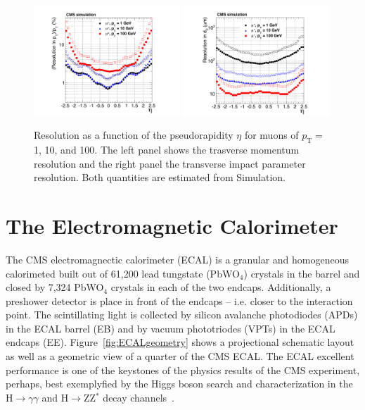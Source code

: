 \begin{figure}
 \centering
\includegraphics[width=0.49\textwidth]{CMS_DetectorFigures/TrackerPtResolution.pdf}
\includegraphics[width=0.49\textwidth]{CMS_DetectorFigures/TrackerImpactParameterResolution.pdf}
 \caption{Resolution as a function of the pseudorapidity $\eta$ for
   muons of $p_{\mathrm{T}} = $ 1, 10, and 100\GeV. The left panel
   shows the trasverse momentum resolution and the right panel the
   transverse impact parameter resolution. Both quantities are
   estimated from Simulation.\label{fig:MuonResolution}}
\end{figure}



\section{The Electromagnetic Calorimeter}
The CMS electromagnectic calorimeter (ECAL) is a granular and homogeneous
calorimeted built out of 61,200 lead tungstate (PbWO$_{4}$) crystals
in the barrel and closed by 7,324 PbWO$_{4}$ crystals in each of the
two endcaps. Additionally, a preshower detector is place in front of
the endcaps -- i.e. closer to the interaction point. The scintillating
light is collected by silicon avalanche photodiodes (APDs) in the ECAL barrel
(EB) and by vacuum phototriodes (VPTs) in the ECAL endcaps
(EE). Figure~\ref{fig:ECALgeometry} shows a projectional schematic
layout as well as a geometric view of a quarter of the CMS ECAL. The
ECAL excellent performance is one of the keystones of the physics
results of the CMS experiment, perhaps, best exemplyfied by the Higgs
boson search and characterization in the H$\rightarrow\gamma\gamma$
and H$\rightarrow$ZZ$^{*}$ decay channels~\cite{CMSHgg, CMSHzz}.

